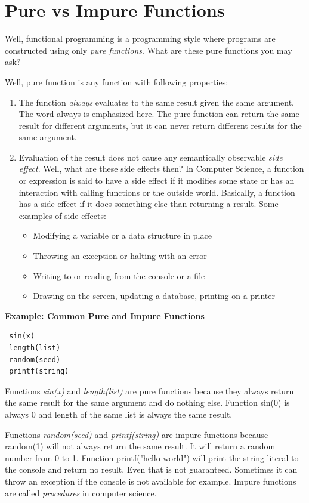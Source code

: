\documentclass[12pt,twoside,a4paper]{report}
\begin{document}
\section{Pure vs Impure Functions}\label{6.4}
Well, functional programming is a programming style where programs are constructed using only \emph{pure functions}. What are these pure functions you may ask? 

Well, pure function is any function with following properties:
\begin{enumerate}
\item The function \emph{always} evaluates to the same result given the same argument. The word always is emphasized here. The pure function can return the same result for different arguments, but it can never return different results for the same argument.
\item Evaluation of the result does not cause any semantically observable \emph{side effect}. Well, what are these side effects then? In Computer Science, a function or expression is said to have a side effect if it modifies some state or has an interaction with calling functions or the outside world. Basically, a function has a side effect if it does something else than returning a result. Some examples of side effects:
\begin{itemize}
\item Modifying a variable or a data structure in place
\item Throwing an exception or halting with an error
\item Writing to or reading from the console or a file
\item Drawing on the screen, updating a database, printing on a printer
\end{itemize}
\end{enumerate}

\textbf{Example: Common Pure and Impure Functions}

\begin{lstlisting}
 sin(x)
 length(list)
 random(seed)
 printf(string)
\end{lstlisting}

Functions \emph{sin(x)} and \emph{length(list)} are pure functions because they always return the same result for the same argument and do nothing else. Function sin(0) is always 0 and length of the same list is always the same result.\par
Functions \emph{random(seed)} and \emph{printf(string)} are impure functions because random(1) will not always return the same result. It will return a random number from 0 to 1. Function printf("hello world") will print the string literal to the console and return no result. Even that is not guaranteed. Sometimes it can throw an exception if the console is not available for example. Impure functions are called \emph{procedures} in computer science.
\end{document}

